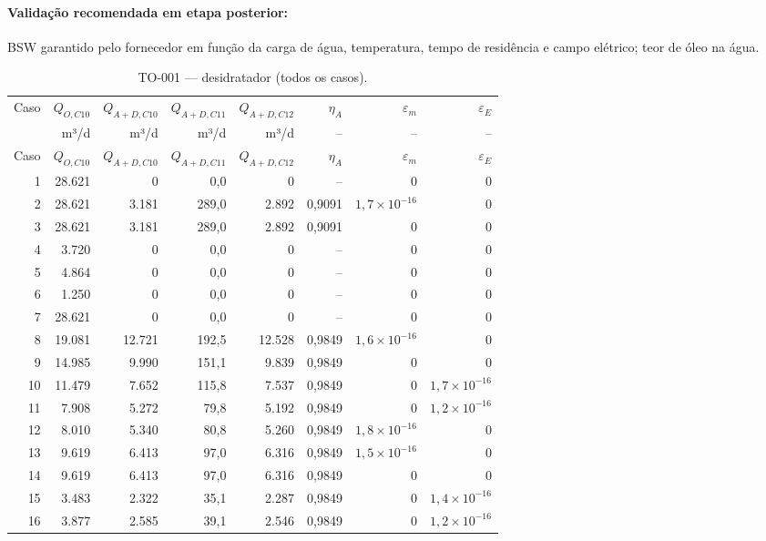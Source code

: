 \documentclass[11pt,a4paper]{article}
\numberwithin{equation}{section}
\numberwithin{table}{section}
\numberwithin{figure}{section}
\begin{document}
\paragraph{Validação recomendada em etapa posterior:} BSW garantido pelo fornecedor em função da carga de água, temperatura, tempo de residência e campo elétrico; teor de óleo na água.
{\footnotesize\setlength{\tabcolsep}{3.5pt}\begin{longtable}{rrrrrrrr}
\caption{TO-001 --- desidratador (todos os casos).\label{tab:b06}}\\\toprule
Caso & $Q_{O,C10}$ & $Q_{A+D,C10}$ & $Q_{A+D,C11}$ & $Q_{A+D,C12}$ & $\eta_A$ & $\varepsilon_m$ & $\varepsilon_E$\\
 & m³/d & m³/d & m³/d & m³/d & -- & -- & --\\\midrule\endfirsthead
\toprule Caso & $Q_{O,C10}$ & $Q_{A+D,C10}$ & $Q_{A+D,C11}$ & $Q_{A+D,C12}$ & $\eta_A$ & $\varepsilon_m$ & $\varepsilon_E$\\\midrule\endhead
1 & 28.621 & 0 & 0,0 & 0 & -- & $0$ & $0$\\
2 & 28.621 & 3.181 & 289,0 & 2.892 & 0,9091 & $1{,}7\times10^{-16}$ & $0$\\
3 & 28.621 & 3.181 & 289,0 & 2.892 & 0,9091 & $0$ & $0$\\
4 & 3.720 & 0 & 0,0 & 0 & -- & $0$ & $0$\\
5 & 4.864 & 0 & 0,0 & 0 & -- & $0$ & $0$\\
6 & 1.250 & 0 & 0,0 & 0 & -- & $0$ & $0$\\
7 & 28.621 & 0 & 0,0 & 0 & -- & $0$ & $0$\\
8 & 19.081 & 12.721 & 192,5 & 12.528 & 0,9849 & $1{,}6\times10^{-16}$ & $0$\\
9 & 14.985 & 9.990 & 151,1 & 9.839 & 0,9849 & $0$ & $0$\\
10 & 11.479 & 7.652 & 115,8 & 7.537 & 0,9849 & $0$ & $1{,}7\times10^{-16}$\\
11 & 7.908 & 5.272 & 79,8 & 5.192 & 0,9849 & $0$ & $1{,}2\times10^{-16}$\\
12 & 8.010 & 5.340 & 80,8 & 5.260 & 0,9849 & $1{,}8\times10^{-16}$ & $0$\\
13 & 9.619 & 6.413 & 97,0 & 6.316 & 0,9849 & $1{,}5\times10^{-16}$ & $0$\\
14 & 9.619 & 6.413 & 97,0 & 6.316 & 0,9849 & $0$ & $0$\\
15 & 3.483 & 2.322 & 35,1 & 2.287 & 0,9849 & $0$ & $1{,}4\times10^{-16}$\\
16 & 3.877 & 2.585 & 39,1 & 2.546 & 0,9849 & $0$ & $1{,}2\times10^{-16}$\\
\bottomrule\end{longtable}}
\end{document}
